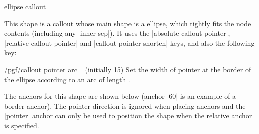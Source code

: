 \begin{shape}{ellipse callout}%
	
  This shape is a callout whose main shape is a ellipse, which
  tightly fits the node contents (including any |inner sep|).
  It uses the |absolute callout pointer|,
	|relative callout pointer| and |callout pointer shorten| keys, and
	also the following key:


\begin{key}{/pgf/callout pointer arc= (initially 15)}
  Set the width of pointer at the border of the ellipse according
  to an arc of length .
\end{key}
	
	
	The anchors for this shape are shown below (anchor |60| is an
	example of a border anchor). The pointer direction is ignored
	when placing anchors and the |pointer| anchor can only be
	used to position the shape when the relative anchor is
	specified.
	
\begin{codeexample}[]
\Huge
{}
\end{codeexample}

\end{shape}


